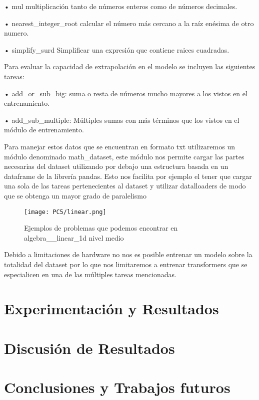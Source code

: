 \documentclass[conference]{IEEEtran}
\begin{document}
  • mul multiplicación tanto de números enteros como de números decimales.
  
  • nearest\_integer\_root calcular el número más cercano a la raíz enésima de otro numero.
  
  • simplify\_surd Simplificar una expresión que contiene raices cuadradas. 

    
Para evaluar la capacidad de extrapolación en el modelo se incluyen las siguientes tareas:


• add\_or\_sub\_big: suma o resta de números mucho mayores a los vistos en el entrenamiento.

• add\_sub\_multiple: Múltiples sumas con más términos que los vistos en el módulo de entrenamiento.




Para manejar estos datos que se encuentran en formato txt utilizaremos un módulo denominado math\_dataset, este módulo nos permite cargar las partes necesarias del dataset utilizando por debajo una estructura basada en un dataframe de la librería pandas.
Esto nos facilita por ejemplo el tener que cargar una sola de las tareas pertenecientes al dataset y utilizar datalloaders de modo que se obtenga un mayor grado de paralelismo


\begin{figure}[h]
\centering
\texttt{[image: PC5/linear.png]}
\caption{Ejemplos de problemas que podemos encontrar en algebra\_\_linear\_1d nivel medio }
\label{fig::scale-dot-product}
\end{figure}

Debido a limitaciones de hardware no nos es posible entrenar un modelo sobre la totalidad del dataset por lo que nos limitaremos a entrenar transformers que se especialicen en una de las múltiples tareas mencionadas.


\section{Experimentación y Resultados}

\section{Discusión de Resultados}

\section{Conclusiones y Trabajos futuros}
\end{document}
